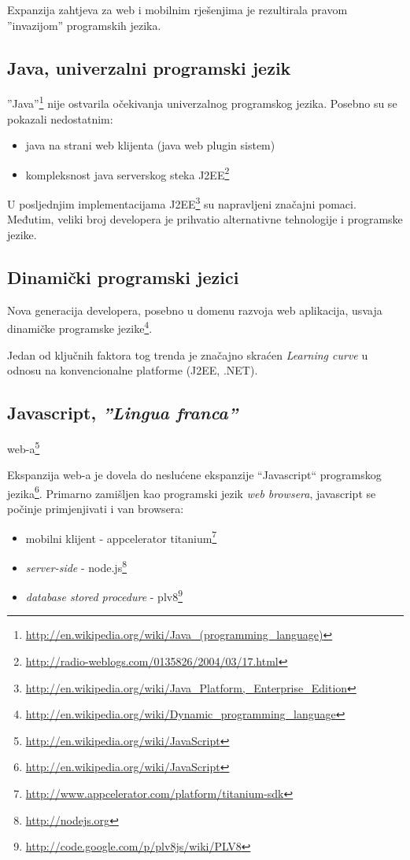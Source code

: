 \documentclass[times, utf8, seminar]{fit}
\begin{document}
Expanzija zahtjeva za web i mobilnim rješenjima je rezultirala pravom ''invazijom'' programskih jezika. 

\subsection{Java, univerzalni programski jezik}

''Java''\footnote{\url{http://en.wikipedia.org/wiki/Java_(programming_language)}} nije ostvarila očekivanja univerzalnog programskog jezika. Posebno su se pokazali nedostatnim: 
\begin{itemize}
  \item java na strani web klijenta (java web plugin sistem)
  \item kompleksnost java serverskog steka J2EE\footnote{\url{http://radio-weblogs.com/0135826/2004/03/17.html}} 
\end{itemize}

U posljednjim implementacijama J2EE\footnote{\url{http://en.wikipedia.org/wiki/Java_Platform,_Enterprise_Edition}} su napravljeni značajni pomaci. Međutim, veliki broj developera je prihvatio alternativne tehnologije i programske jezike.

\subsection{Dinamički programski jezici}

Nova generacija developera, posebno u domenu razvoja web aplikacija, usvaja dinamičke programske jezike\footnote{\url{http://en.wikipedia.org/wiki/Dynamic_programming_language}}. 
 
Jedan od ključnih faktora tog trenda je značajno skraćen \emph{Learning curve} u odnosu na konvencionalne platforme (J2EE, .NET).

\subsection{Javascript, \emph{''Lingua franca''}} web-a\footnote{\url{http://en.wikipedia.org/wiki/JavaScript}}

Ekspanzija web-a je dovela do neslućene ekspanzije ``Javascript`` programskog jezika\footnote{\url{http://en.wikipedia.org/wiki/JavaScript}}. Primarno zamišljen kao programski jezik \emph{web browsera}, javascript se počinje primjenjivati i van browsera:
\begin{itemize}
  \item mobilni klijent - appcelerator titanium\footnote{\url{http://www.appcelerator.com/platform/titanium-sdk}}
  \item \emph{server-side} - node.js\footnote{\url{http://nodejs.org}}
  \item \emph{database stored procedure} - plv8\footnote{\url{http://code.google.com/p/plv8js/wiki/PLV8}}
\end{itemize} 
\end{document}

